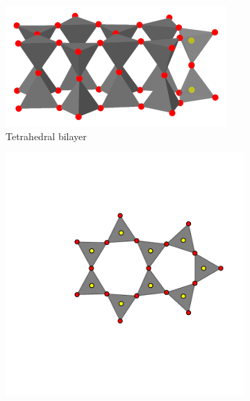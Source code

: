 \begin{figure}[bt]
     \centering
     
     \begin{subfigure}[b]{0.3\textwidth}
         \centering
         \includegraphics[width=\textwidth]{./figures/bilayers/mx2_bilayer_1.pdf}
         \vspace{-1mm}
         \caption{Tetrahedral bilayer}
         \label{fig:bilayer1}
     \end{subfigure}
     \hfill
	\begin{subfigure}[b]{0.3\textwidth}
         \centering
         \includegraphics[width=\textwidth]{./figures/bilayers/mx2_bilayer_2.pdf}

\end{subfigure}
\end{figure}
